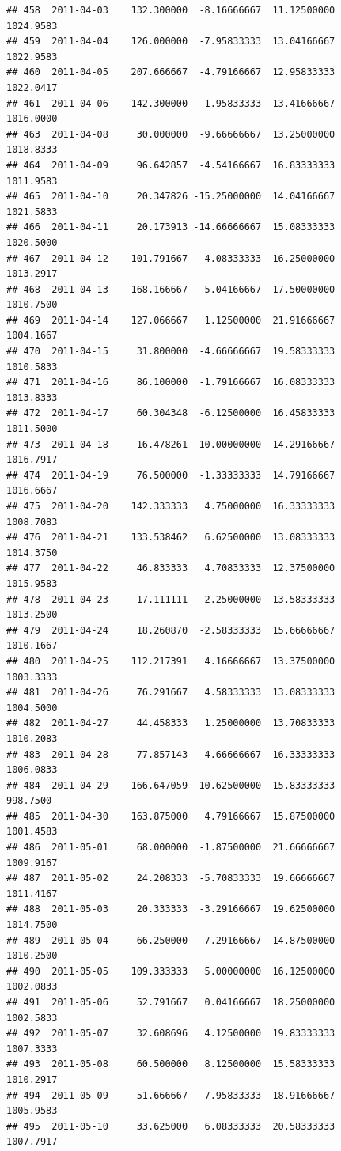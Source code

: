 \documentclass[
]{article}
\begin{document}
\begin{verbatim}
## 458  2011-04-03    132.300000  -8.16666667  11.12500000    1024.9583
## 459  2011-04-04    126.000000  -7.95833333  13.04166667    1022.9583
## 460  2011-04-05    207.666667  -4.79166667  12.95833333    1022.0417
## 461  2011-04-06    142.300000   1.95833333  13.41666667    1016.0000
## 463  2011-04-08     30.000000  -9.66666667  13.25000000    1018.8333
## 464  2011-04-09     96.642857  -4.54166667  16.83333333    1011.9583
## 465  2011-04-10     20.347826 -15.25000000  14.04166667    1021.5833
## 466  2011-04-11     20.173913 -14.66666667  15.08333333    1020.5000
## 467  2011-04-12    101.791667  -4.08333333  16.25000000    1013.2917
## 468  2011-04-13    168.166667   5.04166667  17.50000000    1010.7500
## 469  2011-04-14    127.066667   1.12500000  21.91666667    1004.1667
## 470  2011-04-15     31.800000  -4.66666667  19.58333333    1010.5833
## 471  2011-04-16     86.100000  -1.79166667  16.08333333    1013.8333
## 472  2011-04-17     60.304348  -6.12500000  16.45833333    1011.5000
## 473  2011-04-18     16.478261 -10.00000000  14.29166667    1016.7917
## 474  2011-04-19     76.500000  -1.33333333  14.79166667    1016.6667
## 475  2011-04-20    142.333333   4.75000000  16.33333333    1008.7083
## 476  2011-04-21    133.538462   6.62500000  13.08333333    1014.3750
## 477  2011-04-22     46.833333   4.70833333  12.37500000    1015.9583
## 478  2011-04-23     17.111111   2.25000000  13.58333333    1013.2500
## 479  2011-04-24     18.260870  -2.58333333  15.66666667    1010.1667
## 480  2011-04-25    112.217391   4.16666667  13.37500000    1003.3333
## 481  2011-04-26     76.291667   4.58333333  13.08333333    1004.5000
## 482  2011-04-27     44.458333   1.25000000  13.70833333    1010.2083
## 483  2011-04-28     77.857143   4.66666667  16.33333333    1006.0833
## 484  2011-04-29    166.647059  10.62500000  15.83333333     998.7500
## 485  2011-04-30    163.875000   4.79166667  15.87500000    1001.4583
## 486  2011-05-01     68.000000  -1.87500000  21.66666667    1009.9167
## 487  2011-05-02     24.208333  -5.70833333  19.66666667    1011.4167
## 488  2011-05-03     20.333333  -3.29166667  19.62500000    1014.7500
## 489  2011-05-04     66.250000   7.29166667  14.87500000    1010.2500
## 490  2011-05-05    109.333333   5.00000000  16.12500000    1002.0833
## 491  2011-05-06     52.791667   0.04166667  18.25000000    1002.5833
## 492  2011-05-07     32.608696   4.12500000  19.83333333    1007.3333
## 493  2011-05-08     60.500000   8.12500000  15.58333333    1010.2917
## 494  2011-05-09     51.666667   7.95833333  18.91666667    1005.9583
## 495  2011-05-10     33.625000   6.08333333  20.58333333    1007.7917

\end{verbatim}
\end{document}
